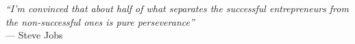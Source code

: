 \cleardoublepage
{}
\thispagestyle{empty}

\vspace*{3cm}

\begin{center}{
    \slshape
    ``I'm convinced that about half of what separates the successful entrepreneurs from the non-successful ones is pure perseverance''} \\
    \medskip
    --- Steve Jobs
\end{center}

\medskip
